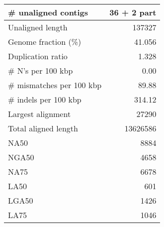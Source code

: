 \documentclass[12pt,a4paper]{article}
\begin{document}
\begin{table}[ht]
\begin{center}
\begin{tabular}{|l*{1}{|r}|}
\# unaligned contigs & 36 + 2 part \\ \hline
Unaligned length & 137327 \\ \hline
Genome fraction (\%) & 41.056 \\ \hline
Duplication ratio & 1.328 \\ \hline
\# N's per 100 kbp & 0.00 \\ \hline
\# mismatches per 100 kbp & 89.88 \\ \hline
\# indels per 100 kbp & 314.12 \\ \hline
Largest alignment & 27290 \\ \hline
Total aligned length & 13626586 \\ \hline
NA50 & 8884 \\ \hline
NGA50 & 4658 \\ \hline
NA75 & 6678 \\ \hline
LA50 & 601 \\ \hline
LGA50 & 1426 \\ \hline
LA75 & 1046 \\ \hline
\end{tabular}
\end{center}
\end{table}
\end{document}
